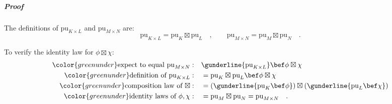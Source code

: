 \subparagraph{Proof}

The definitions of $\text{pu}_{K\times L}$ and $\text{pu}_{M\times N}$
are:
\[
\text{pu}_{K\times L}=\text{pu}_{K}\boxtimes\text{pu}_{L}\quad,\quad\quad\text{pu}_{M\times N}=\text{pu}_{M}\boxtimes\text{pu}_{N}\quad.
\]

To verify the identity law for $\phi\boxtimes\chi$:
\begin{align*}
{\color{greenunder}\text{expect to equal }\text{pu}_{M\times N}:}\quad & \gunderline{\text{pu}_{K\times L}}\bef\phi\boxtimes\chi\\
{\color{greenunder}\text{definition of }\text{pu}_{K\times L}:}\quad & =\text{pu}_{K}\boxtimes\text{pu}_{L}\bef\phi\boxtimes\chi\\
{\color{greenunder}\text{composition law of }\boxtimes:}\quad & =(\gunderline{\text{pu}_{K}\bef\phi})\boxtimes(\gunderline{\text{pu}_{L}\bef\chi})\\
{\color{greenunder}\text{identity laws of }\phi,\chi:}\quad & =\text{pu}_{M}\boxtimes\text{pu}_{N}=\text{pu}_{M\times N}\quad.
\end{align*}

